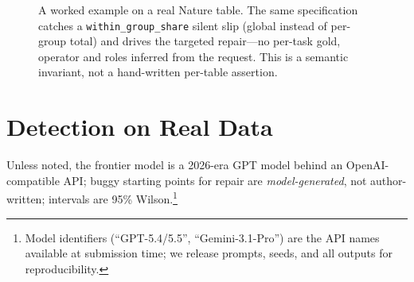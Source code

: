 \documentclass[10pt,twocolumn,letterpaper]{article}
\begin{document}
\begin{figure}[t]\centering
{}
\caption{A worked example on a real Nature table. The same specification catches
a \texttt{within\_group\_share} silent slip (global instead of per-group total)
and drives the targeted repair---no per-task gold, operator and roles inferred
from the request. This is a semantic invariant, not a hand-written per-table
assertion.}
\label{fig:worked}
\end{figure}

\section{Detection on Real Data}\label{sec:detect}
Unless noted, the frontier model is a 2026-era GPT model behind an
OpenAI-compatible API; buggy starting points for repair are \emph{model-generated},
not author-written; intervals are 95\% Wilson.\footnote{Model identifiers
(``GPT-5.4/5.5'', ``Gemini-3.1-Pro'') are the API names available at submission
time; we release prompts, seeds, and all outputs for reproducibility.}
\end{document}
